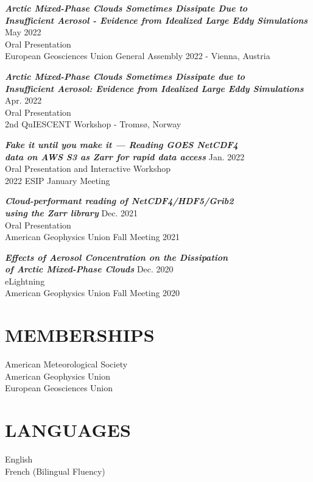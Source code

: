 \documentclass[overlapped]{res}
\begin{document}
\begin{resume}
    {\sl \textbf{Arctic Mixed-Phase Clouds Sometimes Dissipate Due to \\ Insufficient Aerosol - Evidence from Idealized Large Eddy Simulations}} \hfill May 2022 \\ 
    Oral Presentation \\
    European Geosciences Union General Assembly 2022 - Vienna, Austria
    
    {\sl \textbf{Arctic Mixed-Phase Clouds Sometimes Dissipate due to \\ Insufficient Aerosol: Evidence from Idealized Large Eddy Simulations }}\hfill Apr. 2022 \\
    Oral Presentation \\
    2nd QuIESCENT Workshop - Tromsø, Norway

    {\sl \textbf{Fake it until you make it — Reading GOES NetCDF4 \\ data on AWS S3 as Zarr for rapid data access }} \hfill Jan. 2022 \\
    Oral Presentation and Interactive Workshop\\
    2022 ESIP January Meeting

    {\sl \textbf{Cloud-performant reading of NetCDF4/HDF5/Grib2\\ using the Zarr library}} \hfill Dec. 2021 \\
    Oral Presentation \\
    American Geophysics Union Fall Meeting 2021

    {\sl \textbf{Effects of Aerosol Concentration  on the Dissipation \\ of Arctic Mixed-Phase Clouds}} \hfill Dec. 2020 \\ 
    eLightning \\
    American Geophysics Union Fall Meeting 2020
    

                

\section{MEMBERSHIPS}            
    {American Meteorological Society} \\
    {American Geophysics Union} \\
    {European Geosciences Union}

\section{LANGUAGES}
    English \\
    French (Bilingual Fluency)

\end{resume}
\end{document}
